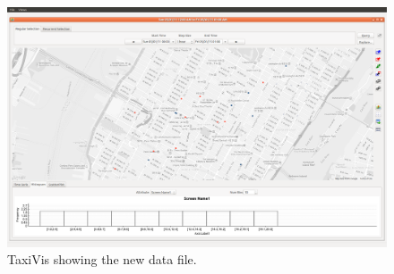 \documentclass[12pt]{article}
\begin{document}
\begin{figure}[h]
\includegraphics[width=\linewidth]{figs/taxivis.png}
\caption{TaxiVis showing the new data file.}
\label{fig:interface}
\end{figure}
\end{document}
